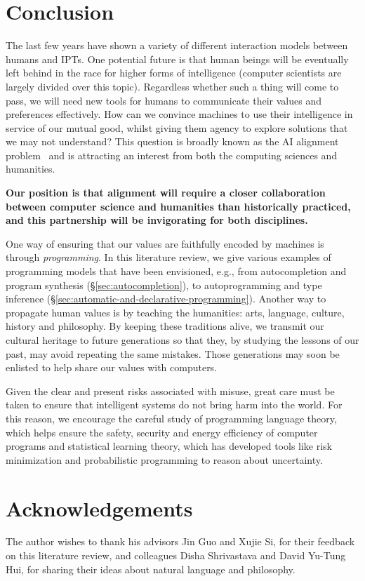 \documentclass[12pt]{article}
\begin{document}
\section{Conclusion}

The last few years have shown a variety of different interaction models between humans and IPTs. One potential future is that human beings will be eventually left behind in the race for higher forms of intelligence (computer scientists are largely divided over this topic). Regardless whether such a thing will come to pass, we will need new tools for humans to communicate their values and preferences effectively. How can we convince machines to use their intelligence in service of our mutual good, whilst giving them agency to explore solutions that we may not understand? This question is broadly known as the AI alignment problem~\cite{kim2018mimetic, christian2020alignment} and is attracting an interest from both the computing sciences and humanities.

\textbf{Our position is that alignment will require a closer collaboration between computer science and humanities than historically practiced, and this partnership will be invigorating for both disciplines.}

One way of ensuring that our values are faithfully encoded by machines is through \textit{programming}. In this literature review, we give various examples of programming models that have been envisioned, e.g., from autocompletion and program synthesis (\S\ref{sec:autocompletion}), to autoprogramming and type inference (\S\ref{sec:automatic-and-declarative-programming}). Another way to propagate human values is by teaching the humanities: arts, language, culture, history and philosophy. By keeping these traditions alive, we transmit our cultural heritage to future generations so that they, by studying the lessons of our past, may avoid repeating the same mistakes. Those generations may soon be enlisted to help share our values with computers.

Given the clear and present risks associated with misuse, great care must be taken to ensure that intelligent systems do not bring harm into the world. For this reason, we encourage the careful study of programming language theory, which helps ensure the safety, security and energy efficiency of computer programs and statistical learning theory, which has developed tools like risk minimization and probabilistic programming to reason about uncertainty.

\section{Acknowledgements}

The author wishes to thank his advisors Jin Guo and Xujie Si, for their feedback on this literature review, and colleagues Disha Shrivastava and David Yu-Tung Hui, for sharing their ideas about natural language and philosophy.

  
  
\end{document}
